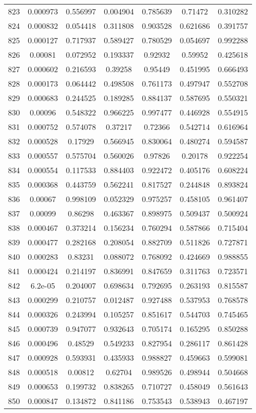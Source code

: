 \begin{table}
\begin{tabular}{c|c|c|c|c|c|c}
823 & 0.000973 & 0.556997 & 0.004904 & 0.785639 & 0.71472 & 0.310282\\
824 & 0.000832 & 0.054418 & 0.311808 & 0.903528 & 0.621686 & 0.391757\\
825 & 0.000127 & 0.717937 & 0.589427 & 0.780529 & 0.054697 & 0.992288\\
826 & 0.00081 & 0.072952 & 0.193337 & 0.92932 & 0.59952 & 0.425618\\
827 & 0.000602 & 0.216593 & 0.39258 & 0.95449 & 0.451995 & 0.666493\\
828 & 0.000173 & 0.064442 & 0.498508 & 0.761173 & 0.497947 & 0.552708\\
829 & 0.000683 & 0.244525 & 0.189285 & 0.884137 & 0.587695 & 0.550321\\
830 & 0.00096 & 0.548322 & 0.966225 & 0.997477 & 0.446928 & 0.554915\\
831 & 0.000752 & 0.574078 & 0.37217 & 0.72366 & 0.542714 & 0.616964\\
832 & 0.000528 & 0.17929 & 0.566945 & 0.830064 & 0.480274 & 0.594587\\
833 & 0.000557 & 0.575704 & 0.560026 & 0.97826 & 0.20178 & 0.922254\\
834 & 0.000554 & 0.117533 & 0.884403 & 0.922472 & 0.405176 & 0.608224\\
835 & 0.000368 & 0.443759 & 0.562241 & 0.817527 & 0.244848 & 0.893824\\
836 & 0.00067 & 0.998109 & 0.052329 & 0.975257 & 0.458105 & 0.961407\\
837 & 0.00099 & 0.86298 & 0.463367 & 0.898975 & 0.509437 & 0.500924\\
838 & 0.000467 & 0.373214 & 0.156234 & 0.760294 & 0.587866 & 0.715404\\
839 & 0.000477 & 0.282168 & 0.208054 & 0.882709 & 0.511826 & 0.727871\\
840 & 0.000283 & 0.83231 & 0.088072 & 0.768092 & 0.424669 & 0.988855\\
841 & 0.000424 & 0.214197 & 0.836991 & 0.847659 & 0.311763 & 0.723571\\
842 & 6.2e-05 & 0.204007 & 0.698634 & 0.792695 & 0.263193 & 0.815587\\
843 & 0.000299 & 0.210757 & 0.012487 & 0.927488 & 0.537953 & 0.768578\\
844 & 0.000326 & 0.243994 & 0.105257 & 0.851617 & 0.544703 & 0.745465\\
845 & 0.000739 & 0.947077 & 0.932643 & 0.705174 & 0.165295 & 0.850288\\
846 & 0.000496 & 0.48529 & 0.549233 & 0.827954 & 0.286117 & 0.861428\\
847 & 0.000928 & 0.593931 & 0.435933 & 0.988827 & 0.459663 & 0.599081\\
848 & 0.000518 & 0.00812 & 0.62704 & 0.989526 & 0.498944 & 0.504668\\
849 & 0.000653 & 0.199732 & 0.838265 & 0.710727 & 0.458049 & 0.561643\\
850 & 0.000847 & 0.134872 & 0.841186 & 0.753543 & 0.538943 & 0.467197\\
\end{tabular}
\end{table}
